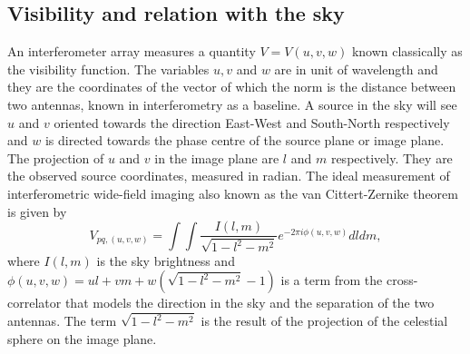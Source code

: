 \documentclass[useAMS,usenatbib]{mn2e}
\begin{document}
\subsection{Visibility and relation with the sky }
\label{sec:visSky}
An interferometer array measures a quantity $V=V(u,v,w)$ known classically as the visibility function.
The variables $u,v$ and $w$ are in unit of wavelength and they are the coordinates of the vector of which the norm is the distance between 
two antennas, known in interferometry as a baseline. A source in the sky will see $u$ and $v$ oriented towards the direction East-West and 
South-North respectively and $w$ is directed towards the phase centre of the source plane or image plane. The projection of $u$ and $v$ in 
the image plane are $l$ and $m$ respectively. They are the observed source coordinates, measured in radian. The ideal measurement of 
interferometric wide-field imaging also known as the van Cittert-Zernike theorem \citep{thompson1999fundamentals} is given by
\begin{equation}
 V_{pq,(u,v,w)}=\int \int \frac{I(l,m)}{\sqrt{1-l^2 - m^2}}e^{-2\pi i \phi (u,v,w)}dldm, \label{eq1:visSky}
\end{equation} 
where $I(l,m)$ is the sky brightness and $\phi(u,v,w)=ul+vm+w(\sqrt{1-l^2 - m^2}-1)$ is a term from the cross-correlator that models the 
direction in the sky and the separation of the two antennas. The term $\sqrt{1-l^2 - m^2}$ is the result of the projection of the celestial 
sphere on the image plane.
% 
\end{document}
